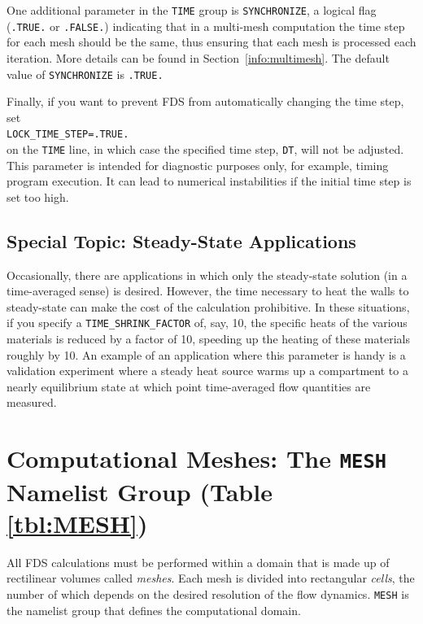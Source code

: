 \documentclass[11pt]{book}
\newcommand{\ct}{\tt\small}
\begin{document}
\noindent
One additional parameter in the {\ct TIME} group is {\ct SYNCHRONIZE}, a
logical flag ({\ct .TRUE.} or {\ct .FALSE.}) indicating that in a
multi-mesh computation the time step for each mesh should be the same, thus
ensuring that each mesh is processed each iteration. More details can
be found in Section~\ref{info:multimesh}. The default value of {\ct SYNCHRONIZE} is {\ct .TRUE.}

Finally, if you want to prevent FDS from automatically changing the time step, set \\
{\ct LOCK\_TIME\_STEP=.TRUE.} \\
on the {\ct TIME} line, in which case the specified
time step, {\ct DT}, will not be adjusted.
This parameter is intended for diagnostic purposes only, for example, timing program execution. It can lead to
numerical instabilities if the initial time step is set too high.



\subsection{Special Topic: Steady-State Applications}
\label{info:steady_state}

Occasionally, there are applications in which only the steady-state solution (in a time-averaged sense) is desired. However, the time necessary to
heat the walls to steady-state can make the cost of the calculation prohibitive. In these situations, if you specify a
{\ct TIME\_SHRINK\_FACTOR} of, say, 10, the specific heats of the various materials is reduced by a factor of 10, speeding up the heating
of these materials roughly by 10. An example of an application where this parameter is handy is a validation experiment where a steady heat source
warms up a compartment to a nearly equilibrium state at which point time-averaged flow quantities are measured.



\newpage

\section{Computational Meshes: The \texorpdfstring{{\tt MESH}}{MESH} Namelist Group (Table \ref{tbl:MESH})}
\label{info:MESH}

All FDS calculations must be performed within a domain that is made up
of rectilinear volumes called {\em meshes}. Each mesh is divided into rectangular {\em cells},
the number of which depends on the desired resolution of the flow dynamics.
{\ct MESH} is the namelist group that defines the computational domain.
\end{document}
